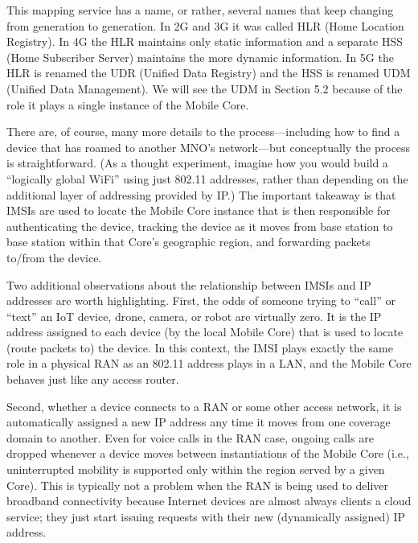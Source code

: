\documentclass[a4paper,11pt,english]{sphinxmanual}
\begin{document}
\sphinxAtStartPar
This mapping service has a name, or rather, several names that keep
changing from generation to generation. In 2G and 3G it was called HLR
(Home Location Registry). In 4G the HLR maintains only static
information and a separate HSS (Home Subscriber Server) maintains the
more dynamic information. In 5G the HLR is renamed the UDR (Unified
Data Registry) and the HSS is renamed UDM (Unified Data
Management). We will see the UDM in Section 5.2 because of the role it
plays  a single instance of the Mobile Core.

\sphinxAtStartPar
There are, of course, many more details to the process—including how
to find a device that has roamed to another MNO’s network—but
conceptually the process is straightforward. (As a thought experiment,
imagine how you would build a “logically global WiFi” using just
802.11 addresses, rather than depending on the additional layer of
addressing provided by IP.) The important takeaway is that IMSIs are
used to locate the Mobile Core instance that is then responsible for
authenticating the device, tracking the device as it moves from base
station to base station within that Core’s geographic region, and
forwarding packets to/from the device.

\sphinxAtStartPar
Two additional observations about the relationship between IMSIs and IP
addresses are worth highlighting. First, the odds of someone trying to
“call” or “text” an IoT device, drone, camera, or robot are virtually
zero. It is the IP address assigned to each device (by the local
Mobile Core) that is used to locate (route packets to) the device. In
this context, the IMSI plays exactly the same role in a physical RAN
as an 802.11 address plays in a LAN, and the Mobile Core behaves just
like any access router.

\sphinxAtStartPar
Second, whether a device connects to a RAN or some other access
network, it is automatically assigned a new IP address any time it
moves from one coverage domain to another. Even for voice calls in the
RAN case, ongoing calls are dropped whenever a device moves between
instantiations of the Mobile Core (i.e., uninterrupted mobility is
supported only within the region served by a given Core). This is
typically not a problem when the RAN is being used to deliver
broadband connectivity because Internet devices are almost always
clients  a cloud service; they just start issuing requests
with their new (dynamically assigned) IP address.
\end{document}
